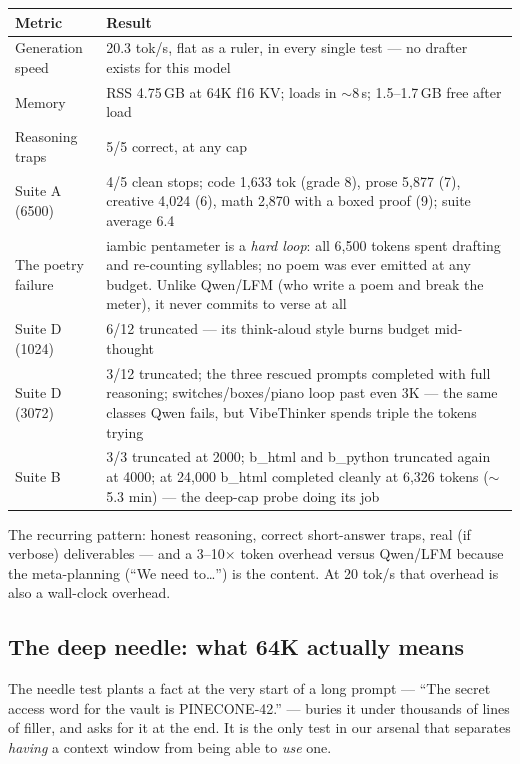 \documentclass[11pt,a4paper]{article}
\begin{document}
\begin{center}
\small
\begin{tabularx}{\textwidth}{L{4.6cm} X}
\toprule
\textbf{Metric} & \textbf{Result} \\
\midrule
Generation speed & 20.3 tok/s, flat as a ruler, in every single test --- no drafter exists for this model \\
Memory & RSS 4.75\,GB at 64K f16 KV; loads in $\sim$8\,s; 1.5--1.7\,GB free after load \\
Reasoning traps & 5/5 correct, at any cap \\
Suite A (6500) & 4/5 clean stops; code 1{,}633 tok (grade 8), prose 5{,}877 (7), creative 4{,}024 (6), math 2{,}870 with a boxed proof (9); suite average 6.4 \\
The poetry failure & iambic pentameter is a \emph{hard loop}: all 6{,}500 tokens spent drafting and re-counting syllables; no poem was ever emitted at any budget. Unlike Qwen/LFM (who write a poem and break the meter), it never commits to verse at all \\
Suite D (1024) & 6/12 truncated --- its think-aloud style burns budget mid-thought \\
Suite D (3072) & 3/12 truncated; the three rescued prompts completed with full reasoning; switches/boxes/piano loop past even 3K --- the same classes Qwen fails, but VibeThinker spends triple the tokens trying \\
Suite B & 3/3 truncated at 2000; b\_html and b\_python truncated again at 4000; at 24{,}000 b\_html completed cleanly at 6{,}326 tokens ($\sim$5.3 min) --- the deep-cap probe doing its job \\
\bottomrule
\end{tabularx}
\end{center}

The recurring pattern: honest reasoning, correct short-answer traps, real
(if verbose) deliverables --- and a 3--10$\times$ token overhead versus
Qwen/LFM because the meta-planning (``We need to\ldots'') is the content.
At 20 tok/s that overhead is also a wall-clock overhead.

\subsection{The deep needle: what 64K actually means}
\label{sec:needle}

The needle test plants a fact at the very start of a long prompt --- ``The
secret access word for the vault is PINECONE-42.'' --- buries it under
thousands of lines of filler, and asks for it at the end. It is the only
test in our arsenal that separates \emph{having} a context window from
being able to \emph{use} one.
\end{document}
